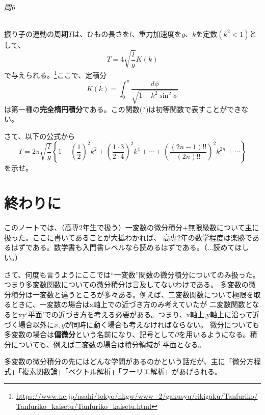 \documentclass[a4j,dvipdfmx]{jsarticle}
\begin{document}
            \paragraph{問6}振り子の運動の周期$T$は、ひもの長さを$l$、重力加速度を$g$、$k$を定数$(k^2<1)$として、
            \begin{equation*}
                T=4\sqrt{\frac{l}{g}}K(k)
            \end{equation*}
            で与えられる。\footnote{\url{https://www.ne.jp/asahi/tokyo/nkgw/www_2/gakusyu/rikigaku/Tanfuriko/Tanfuriko_kaisetu/Tanfuriko_kaisetu.html}}ここで、定積分
            \begin{equation*}
                K(k)=\int_{0}^{\pi}\frac{d\phi}{\sqrt{1-k^2\sin^2\phi}}
            \end{equation*}
            は第一種の\textbf{完全楕円積分}である。この関数(?)は初等関数で表すことができない。

            さて、以下の公式から
            \begin{equation*}
                T=2\pi \sqrt{\frac{l}{g}}\left\{1+\left(\frac{1}{2}\right)^2k^2+\left(\frac{1\cdot 3}{2\cdot 4}\right)^2k^4+\cdots+\left(\frac{(2n-1)!!}{(2n)!!}\right)^2k^{2n}+\cdots\right\}
            \end{equation*}
            を示せ。

                
    \clearpage
    \part{終わりに}
        このノートでは、（高専2年生で扱う）一変数の微分積分+無限級数について主に扱った。ここに書いてあることが大抵わかれば、
        高専2年の数学程度は楽勝であるはずである。数学書も入門書レベルなら読めるはずである。（...読めてほしい。）
        
        さて、何度も言うようにここでは``一変数''関数の微分積分についてのみ扱った。つまり多変数関数についての微分積分は言及してないわけである。
        多変数の微分積分は一変数と違うところが多々ある。例えば、二変数関数について極限を取るときに、一変数の場合はx軸上での近づき方のみ考えていたが
        二変数関数となるとxy`平面'での近づき方を考える必要がある。つまり、x軸上,y軸上に沿って近づく場合以外に$x,y$が同時に動く場合も考えなければならない。
        微分についても多変数の場合は\textbf{偏微分}という名前になり、記号として$\partial$を用いるようになる。積分についても、例えば二変数の場合は積分領域が
        平面となる。

        多変数の微分積分の先にはどんな学問があるのかという話だが、主に「微分方程式」「複素関数論」「ベクトル解析」「フーリエ解析」があげられる。\\
\end{document}
